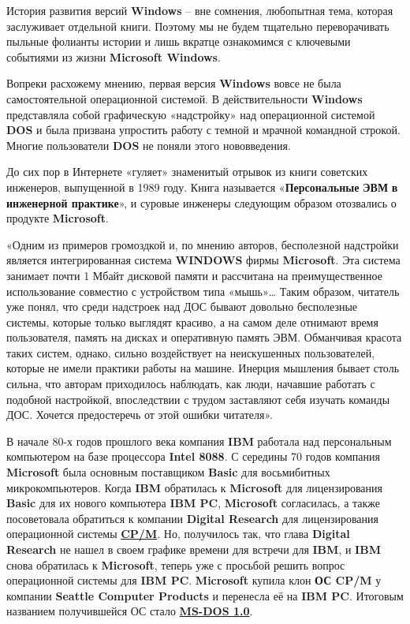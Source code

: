 \documentclass[14pt, a4paper]{article}
\begin{document}
История развития версий \textbf{Windows} – вне сомнения, любопытная тема, которая заслуживает отдельной книги. 
Поэтому мы не будем тщательно переворачивать пыльные фолианты истории и лишь вкратце ознакомимся с ключевыми событиями из жизни \textbf{Microsoft Windows}.


Вопреки расхожему мнению, первая версия \textbf{Windows} вовсе не была самостоятельной операционной системой.
В действительности \textbf{Windows} представляла собой графическую «надстройку» над операционной системой \textbf{DOS} и была призвана упростить работу с темной и мрачной командной строкой. 
Многие пользователи \textbf{DOS} не поняли этого нововведения.


До сих пор в Интернете «гуляет» знаменитый отрывок из книги советских инженеров,
выпущенной в 1989 году. Книга называется «\textbf{Персо\-нальные} \textbf{ЭВМ} \textbf{в инженерной практике}»,
и суровые инженеры следующим образом отозвались о продукте \textbf{Microsoft}.


«Одним из примеров громоздкой и, по мнению авторов, бесполезной надстройки является интегрированная система \textbf{WINDOWS} фирмы \linebreak[4]\textbf{Microsoft}.
Эта система занимает почти 1 Мбайт дисковой памяти и рассчитана на преимущественное использование совместно с устройством типа «мышь»…
Таким образом, читатель уже понял, что среди надстроек над ДОС бывают довольно бесполезные системы, которые только выглядят красиво,
а на самом деле отнимают время пользователя, память на дисках и оперативную память ЭВМ. Обманчивая красота таких систем, однако, сильно воздействует на неискушенных пользователей,
которые не имели практики работы на машине. Инерция мышления бывает столь сильна, что авторам приходилось наблюдать, как люди, начавшие работать с подобной настройкой,
впоследствии с трудом заставляют себя изучать команды ДОС. Хочется предостеречь от этой ошибки читателя».


В начале 80-х годов прошлого века компания \textbf{IBM} работала над персональным компьютером на базе процессора \textbf{Intel 8088}.
С середины 70 годов компания \textbf{Microsoft} была основным поставщиком \textbf{Basic} для восьмибитных микрокомпьютеров.
Когда \textbf{IBM} обратилась к \textbf{Microsoft} для лицензирования \textbf{Basic} для их нового компьютера \textbf{IBM PC}, \textbf{Microsoft} согласилась,
а также посоветовала обратиться к компании \textbf{Digital Research} для лицензирования операционной системы \textbf{\underline{CP/M}}.
Но, получилось так, что глава \textbf{Digital Research} не нашел в своем графике времени для встречи для \textbf{IBM},
и \textbf{IBM} снова обратилась к \textbf{Microsoft}, теперь уже с просьбой решить вопрос операционной системы для \textbf{IBM PC}.
\textbf{Microsoft} купила клон \textbf{ОС CP/M} у компании \textbf{Seattle Computer Products} и перенесла её на \textbf{IBM PC}.
Итоговым названием получившейся ОС стало \textbf{\underline{MS-DOS 1.0}}.
\end{document}

